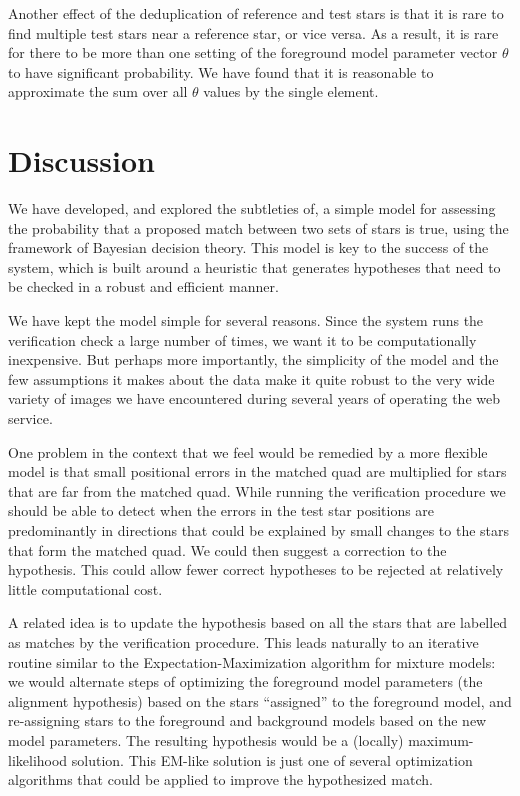 Another effect of the deduplication of reference and test stars is
that it is rare to find multiple test stars near a reference star, or
vice versa.  As a result, it is rare for there to be more than one
setting of the foreground model parameter vector $\theta$ to have
significant probability.  We have found that it is reasonable to
approximate the sum over all $\theta$ values by the single
\MAP element.


\section{Discussion}


We have developed, and explored the subtleties of, a simple model for
assessing the probability that a proposed match between two sets of
stars is true, using the framework of Bayesian decision theory.  This
model is key to the success of the \an system, which is built around a
heuristic that generates hypotheses that need to be checked in a
robust and efficient manner.


We have kept the model simple for several reasons.  Since the \an
system runs the verification check a large number of times, we want it
to be computationally inexpensive.  But perhaps more importantly, the
simplicity of the model and the few assumptions it makes about the
data make it quite robust to the very wide variety of images we have
encountered during several years of operating the \an web service.




One problem in the \an context that we feel would be remedied by a
more flexible model is that small positional errors in the matched
quad are multiplied for stars that are far from the matched quad.
While running the verification procedure we should be able to detect
when the errors in the test star positions are predominantly in
directions that could be explained by small changes to the stars that
form the matched quad.  We could then suggest a correction to the
hypothesis.  This could allow fewer correct hypotheses to be rejected
at relatively little computational cost.


A related idea is to update the hypothesis based on all the stars that
are labelled as matches by the verification procedure.  This leads
naturally to an iterative routine similar to the
Expectation-Maximization algorithm \cite{em1977} for mixture models:
we would alternate steps of optimizing the foreground model parameters
(the alignment hypothesis) based on the stars ``assigned'' to the
foreground model, and re-assigning stars to the foreground and
background models based on the new model parameters.  The resulting
hypothesis would be a (locally) maximum-likelihood solution.  This
EM-like solution is just one of several optimization algorithms that
could be applied to improve the hypothesized match.


